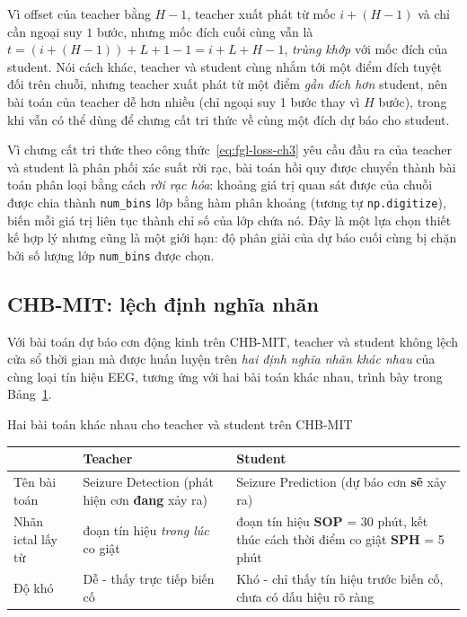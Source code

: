 Vì offset của teacher bằng $H-1$, teacher xuất phát từ mốc $i + (H-1)$ và chỉ cần ngoại suy
$1$ bước, nhưng mốc đích cuối cùng vẫn là $t = \left(i+(H-1)\right) + L + 1 - 1 = i+L+H-1$,
\textit{trùng khớp} với mốc đích của student. Nói cách khác, teacher và student cùng nhắm tới
một điểm đích tuyệt đối trên chuỗi, nhưng teacher xuất phát từ một điểm \textit{gần đích hơn}
student, nên bài toán của teacher dễ hơn nhiều (chỉ ngoại suy 1 bước thay vì $H$ bước), trong
khi vẫn có thể dùng để chưng cất tri thức về cùng một đích dự báo cho student.

Vì chưng cất tri thức theo công thức~\eqref{eq:fgl-loss-ch3} yêu cầu đầu ra của teacher và
student là phân phối xác suất rời rạc, bài toán hồi quy được chuyển thành bài toán phân loại
bằng cách \textit{rời rạc hóa}: khoảng giá trị quan sát được của chuỗi được chia thành
\texttt{num\_bins} lớp bằng hàm phân khoảng (tương tự \texttt{np.digitize}), biến mỗi giá trị
liên tục thành chỉ số của lớp chứa nó. Đây là một lựa chọn thiết kế hợp lý nhưng cũng là một
giới hạn: độ phân giải của dự báo cuối cùng bị chặn bởi số lượng lớp \texttt{num\_bins} được
chọn.

\subsection{CHB-MIT: lệch định nghĩa nhãn}

Với bài toán dự báo cơn động kinh trên CHB-MIT, teacher và student không lệch cửa sổ thời
gian mà được huấn luyện trên \textit{hai định nghĩa nhãn khác nhau} của cùng loại tín hiệu EEG,
tương ứng với hai bài toán khác nhau, trình bày trong Bảng~\ref{bang:chbmit-nhan}.

\begin{table}[H]{Hai bài toán khác nhau cho teacher và student trên CHB-MIT}
	\label{bang:chbmit-nhan}
	\centering
	\small
	\begin{tabular}{p{2.6cm}p{5.6cm}p{5.6cm}}
		\toprule
		 & \textbf{Teacher} & \textbf{Student} \\
		\midrule
		Tên bài toán & Seizure Detection (phát hiện cơn \textbf{đang} xảy ra) & Seizure Prediction (dự báo cơn \textbf{sẽ} xảy ra) \\
		Nhãn ictal lấy từ & đoạn tín hiệu \textit{trong lúc} co giật & đoạn tín hiệu \textbf{SOP} = 30 phút, kết thúc cách thời điểm co giật \textbf{SPH} = 5 phút \\
		Độ khó & Dễ - thấy trực tiếp biến cố & Khó - chỉ thấy tín hiệu trước biến cố, chưa có dấu hiệu rõ ràng \\
		\bottomrule
	\end{tabular}
\end{table}

